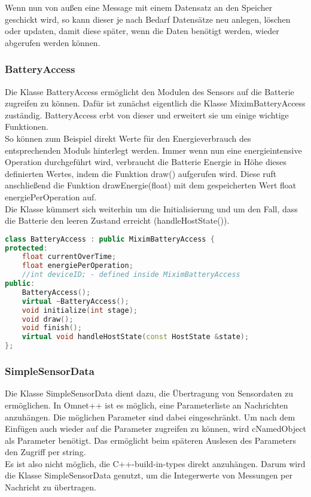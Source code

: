 Wenn nun von außen eine Message mit einem Datensatz an den Speicher geschickt wird, so kann dieser je nach Bedarf Datensätze neu anlegen, löschen oder updaten, damit diese später, wenn die Daten benötigt werden, wieder abgerufen werden können.

\subsubsection{BatteryAccess}

Die Klasse BatteryAccess ermöglicht den Modulen des Sensors auf die Batterie zugreifen zu können. Dafür ist zunächst eigentlich die Klasse MiximBatteryAccess zuständig. BatteryAccess erbt von dieser und erweitert sie um einige wichtige Funktionen.\\
So können zum Beispiel direkt Werte für den Energieverbrauch des entsprechenden Moduls hinterlegt werden. Immer wenn nun eine energieintensive Operation durchgeführt wird, verbraucht die Batterie Energie in Höhe dieses definierten Wertes, indem die Funktion draw() aufgerufen wird. Diese ruft anschließend die Funktion drawEnergie(float) mit dem gespeicherten Wert float energiePerOperation auf. \\
Die Klasse kümmert sich weiterhin um die Initialisierung und um den Fall, dass die Batterie den leeren Zustand erreicht (handleHostState()).

\begin{lstlisting}[language=C++, label=lst:BatteryAccess, caption=BatteryAccess]
class BatteryAccess : public MiximBatteryAccess {
protected:
    float currentOverTime;
    float energiePerOperation;
    //int deviceID; - defined inside MiximBatteryAccess
public:
    BatteryAccess();
    virtual ~BatteryAccess();
    void initialize(int stage);
    void draw();
    void finish();
    virtual void handleHostState(const HostState &state);
};
\end{lstlisting}

\subsubsection{SimpleSensorData}

Die Klasse SimpleSensorData dient dazu, die Übertragung von Sensordaten zu ermöglichen. In Omnet++ ist es möglich, eine Parameterliste an Nachrichten anzuhängen. Die möglichen Parameter sind dabei eingeschränkt. Um nach dem Einfügen auch wieder auf die Parameter zugreifen zu können, wird cNamedObject als Parameter benötigt. Das ermöglicht beim späteren Auslesen des Parameters den Zugriff per string.\\
Es ist also nicht möglich, die C++-build-in-types direkt anzuhängen. Darum wird die Klasse SimpleSensorData genutzt, um die Integerwerte von Messungen per Nachricht zu übertragen.

